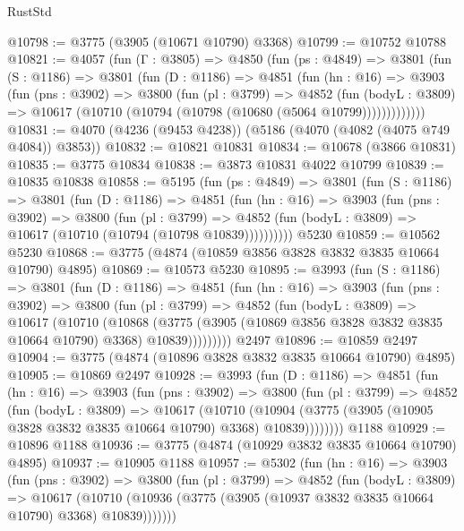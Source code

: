 \begin{lexlean}{RustStd}
\begin{coremodule}
{\begin{coremodule}
{{{{{{{{{{{{{{{{{{{{{{{{{{{{{{{@10798 := @3775 (@3905 (@10671 @10790) @3368)
@10799 := @10752 @10788
@10821 := @4057
    (fun (Γ : @3805) =>
    @4850
      (fun (ps : @4849) =>
      @3801
        (fun (S : @1186) =>
        @3801
          (fun (D : @1186) =>
          @4851
            (fun (hn : @16) =>
            @3903
              (fun (pns : @3902) =>
              @3800
                (fun (pl : @3799) =>
                @4852
                  (fun (bodyL : @3809) =>
                  @10617 (@10710 (@10794 (@10798 (@10680 (@5064 @10799)))))))))))))
@10831 := @4070 (@4236 (@9453 @4238)) (@5186 (@4070 (@4082 (@4075 @749 @4084)) @3853))
@10832 := @10821 @10831
@10834 := @10678 (@3866 @10831)
@10835 := @3775 @10834
@10838 := @3873 @10831 @4022 @10799
@10839 := @10835 @10838
@10858 := @5195
    (fun (ps : @4849) =>
    @3801
      (fun (S : @1186) =>
      @3801
        (fun (D : @1186) =>
        @4851
          (fun (hn : @16) =>
          @3903
            (fun (pns : @3902) =>
            @3800
              (fun (pl : @3799) =>
              @4852 (fun (bodyL : @3809) => @10617 (@10710 (@10794 (@10798 @10839))))))))))
    @5230
@10859 := @10562 @5230
@10868 := @3775 (@4874 (@10859 @3856 @3828 @3832 @3835 @10664 @10790) @4895)
@10869 := @10573 @5230
@10895 := @3993
    (fun (S : @1186) =>
    @3801
      (fun (D : @1186) =>
      @4851
        (fun (hn : @16) =>
        @3903
          (fun (pns : @3902) =>
          @3800
            (fun (pl : @3799) =>
            @4852
              (fun (bodyL : @3809) =>
              @10617
                (@10710
                  (@10868
                    (@3775
                      (@3905 (@10869 @3856 @3828 @3832 @3835 @10664 @10790) @3368)
                      @10839)))))))))
    @2497
@10896 := @10859 @2497
@10904 := @3775 (@4874 (@10896 @3828 @3832 @3835 @10664 @10790) @4895)
@10905 := @10869 @2497
@10928 := @3993
    (fun (D : @1186) =>
    @4851
      (fun (hn : @16) =>
      @3903
        (fun (pns : @3902) =>
        @3800
          (fun (pl : @3799) =>
          @4852
            (fun (bodyL : @3809) =>
            @10617
              (@10710
                (@10904 (@3775 (@3905 (@10905 @3828 @3832 @3835 @10664 @10790) @3368) @10839))))))))
    @1188
@10929 := @10896 @1188
@10936 := @3775 (@4874 (@10929 @3832 @3835 @10664 @10790) @4895)
@10937 := @10905 @1188
@10957 := @5302
    (fun (hn : @16) =>
    @3903
      (fun (pns : @3902) =>
      @3800
        (fun (pl : @3799) =>
        @4852
          (fun (bodyL : @3809) =>
          @10617
            (@10710 (@10936 (@3775 (@3905 (@10937 @3832 @3835 @10664 @10790) @3368) @10839)))))))
}}}}}}}}}}}}}}}}}}}}}}}}}}}}}}}
\end{coremodule}}
\end{coremodule}
\end{lexlean}
